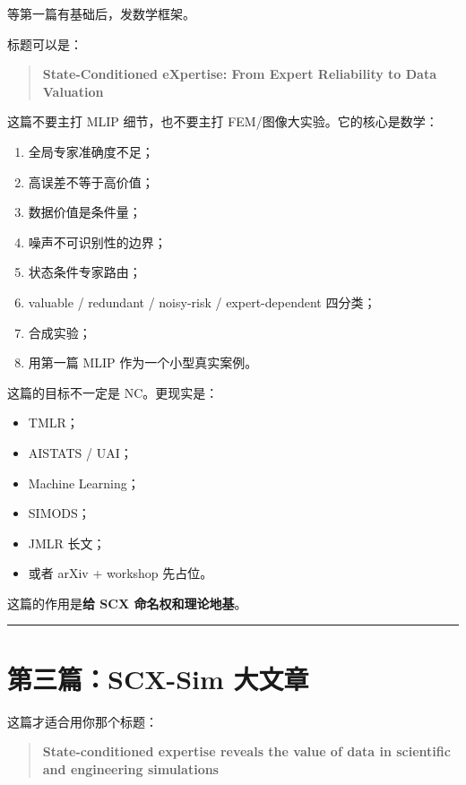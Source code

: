\documentclass[
  12pt,
]{ctexart}
\providecommand{\tightlist}{%
  \setlength{\itemsep}{0pt}\setlength{\parskip}{0pt}}
\begin{document}
等第一篇有基础后，发数学框架。

标题可以是：

\begin{quote}
\textbf{State-Conditioned eXpertise: From Expert Reliability to Data
Valuation}
\end{quote}

这篇不要主打 MLIP 细节，也不要主打 FEM/图像大实验。它的核心是数学：

\begin{enumerate}
\def\labelenumi{\arabic{enumi}.}
\tightlist
\item
  全局专家准确度不足；
\item
  高误差不等于高价值；
\item
  数据价值是条件量；
\item
  噪声不可识别性的边界；
\item
  状态条件专家路由；
\item
  valuable / redundant / noisy-risk / expert-dependent 四分类；
\item
  合成实验；
\item
  用第一篇 MLIP 作为一个小型真实案例。
\end{enumerate}

这篇的目标不一定是 NC。更现实是：

\begin{itemize}
\tightlist
\item
  TMLR；
\item
  AISTATS / UAI；
\item
  Machine Learning；
\item
  SIMODS；
\item
  JMLR 长文；
\item
  或者 arXiv + workshop 先占位。
\end{itemize}

这篇的作用是\textbf{给 SCX 命名权和理论地基}。

\begin{center}\rule{0.5\linewidth}{0.5pt}\end{center}

\section{\texorpdfstring{\textbf{第三篇：SCX-Sim
大文章}}{第三篇：SCX-Sim 大文章}}\label{ux7b2cux4e09ux7bc7scx-sim-ux5927ux6587ux7ae0}

这篇才适合用你那个标题：

\begin{quote}
\textbf{State-conditioned expertise reveals the value of data in
scientific and engineering simulations}
\end{quote}
\end{document}
